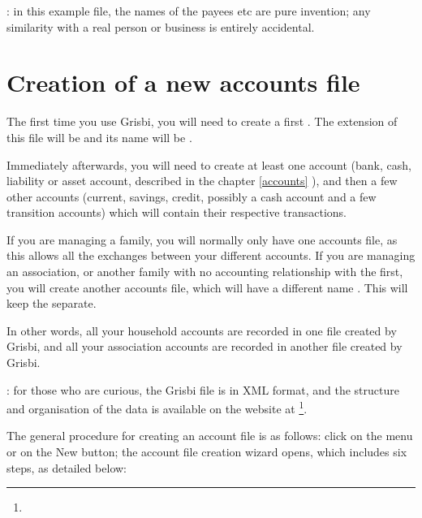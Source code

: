 \Note{}: in this example file, the names of the payees etc are pure invention; any similarity with a real person or business is entirely accidental.

\section{Creation of a new accounts file\label{start-newfile}}


The first time you use Grisbi, you will need to create a first
. The \gls{extension} of this file will be  and its name will be .

Immediately afterwards, you will need to create at least one account (bank, cash, liability or asset account, described in the chapter \vref{accounts} ), and then a few other accounts (current, savings, credit, possibly a cash account and a few transition accounts) which will contain their respective transactions.

If you are managing a family, you will normally only have one accounts file, as this allows all the exchanges between your different accounts. If you are managing an association, or another family with no accounting relationship with the first, you will create another accounts file, which will have a different name . This will keep the  separate.

In other words, all your household accounts are recorded in one file created by Grisbi, and all your association accounts are recorded in another file created by Grisbi.

\Note{}: for those who are curious, the Grisbi file is in \gls{XML} format, and the structure and organisation of the data is available on the website at \footnote{\urlSourceForgeDocumentationFormat{}}.

The general procedure for creating an account file is as follows: click on the menu  or on the New button; the account file creation wizard opens, which includes six steps, as detailed below:

